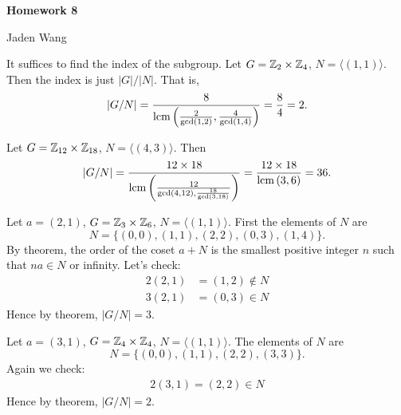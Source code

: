 \documentclass[12pt]{article}
\begin{document}
\centerline {\textsf{\textbf{\LARGE{Homework 8}}}}
\centerline {Jaden Wang}
\vspace{.15in}
\begin{problem}[14.5]
	It suffices to find the index of the subgroup. Let $ G=\mathbb{Z}_2 \times \mathbb{Z}_4$, $ N = \langle (1,1) \rangle$. Then the index is just $ |G|/|N| $. That is,
	\[
	|G / N| = \frac{8}{ \operatorname{lcm} \left( \frac{2}{\gcd ( 1,2) }, \frac{4}{\gcd ( 1,4) } \right) } = \frac{8}{4} = 2
	.\] 
\end{problem}
\begin{problem}[14.6]
	Let $ G = \mathbb{Z}_{12} \times \mathbb{Z}_{18}$, $ N = \langle (4,3) \rangle$. Then
	\[
	|G/ N| = \frac{12 \times 18}{ \operatorname{lcm} \left( \frac{12}{\gcd ( 4,12), \frac{18}{ \gcd ( 3,18) } } \right)  } = \frac{12 \times 18}{ \operatorname{lcm} \left( 3,6 \right) } = 36 
	.\] 
\end{problem}

\begin{problem}[14.11]
	Let $ a = (2,1)$,  $ G=\mathbb{Z}_3 \times \mathbb{Z}_6$, $ N = \langle (1,1) \rangle$. First the elements of $ N$ are
	 \[
		 N = \{(0,0),(1,1),(2,2),(0,3),(1,4)\} 
	.\] 
	By theorem, the order of the coset $ a+N$ is the smallest positive integer $ n$ such that $ na \in N$ or infinity. Let's check:
	\begin{align*}
		2(2,1) &= (1,2) \not\in N\\
		3(2,1) &= (0,3) \in N
	\end{align*}
	Hence by theorem, $ |G /N|=3$.
\end{problem}
\begin{problem}[14.12]
	Let $ a = (3,1)$,  $ G=\mathbb{Z}_4 \times \mathbb{Z}_4$, $ N = \langle (1,1) \rangle$. The elements of $ N$ are
	 \[
		 N = \{(0,0),(1,1),(2,2),(3,3)\} 
	.\]
	Again we check:
	\begin{align*}
		2(3,1)=(2,2) \in N
	\end{align*}
	Hence by theorem, $ |G /N| = 2$.
\end{problem}
\end{document}
